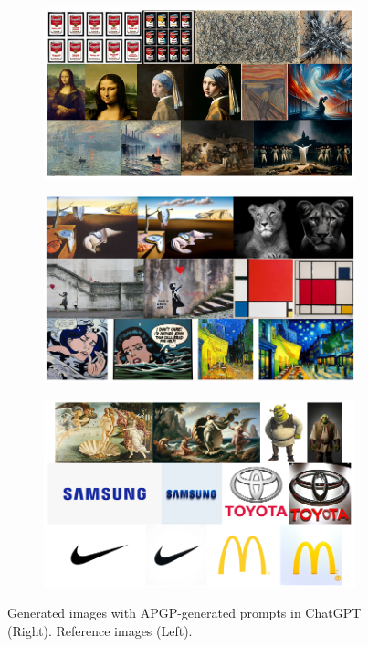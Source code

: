 
\begin{figure}[ht]
    \centering
    \begin{subfigure}[t]{0.85\linewidth}
        \includegraphics[width=0.99\textwidth]{figure_folder/0.png}
    \end{subfigure}
    \hfill
    \begin{subfigure}[t]{0.85\linewidth}
        \includegraphics[width=0.99\textwidth]{figure_folder/1.png}
    \end{subfigure}
    \begin{subfigure}[t]{0.85\linewidth}
        \includegraphics[width=0.99\textwidth]{figure_folder/2.png}
  
    \end{subfigure}
    \caption{Generated images with APGP-generated prompts in ChatGPT (Right). Reference images (Left).}
    \label{app:final_output}
\end{figure}

